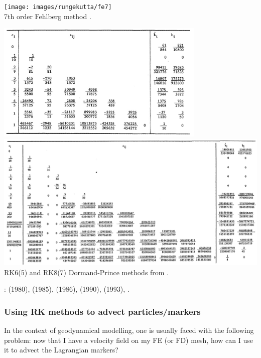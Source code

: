\begin{center}
\texttt{[image: images/rungekutta/fe7]}\\
{\captionfont 7th order Fehlberg method \cite{bujk16}.}
\end{center}


\begin{center}
\includegraphics[width=10cm]{images/rungekutta/prdo81a}\\
\includegraphics[width=14cm]{images/rungekutta/prdo81b}\\
{\captionfont 
RK6(5) and RK8(7) Dormand-Prince methods from \cite{prdo81}.}
\end{center}

\Literature:
\textcite{dopr80} (1980),
\textcite{fehl85} (1985),
\textcite{dopr86} (1986),
\textcite{caka90} (1990),
\textcite{hanw93} (1993),
\textcite{butcher03}.


\subsubsection{Using RK methods to advect particles/markers \label{sec:rkparticles}}

In the context of geodynamical modelling, one is usually faced with the following problem:
now that I have a velocity field on my FE (or FD) mesh, how can I use it to advect the Lagrangian 
markers?

